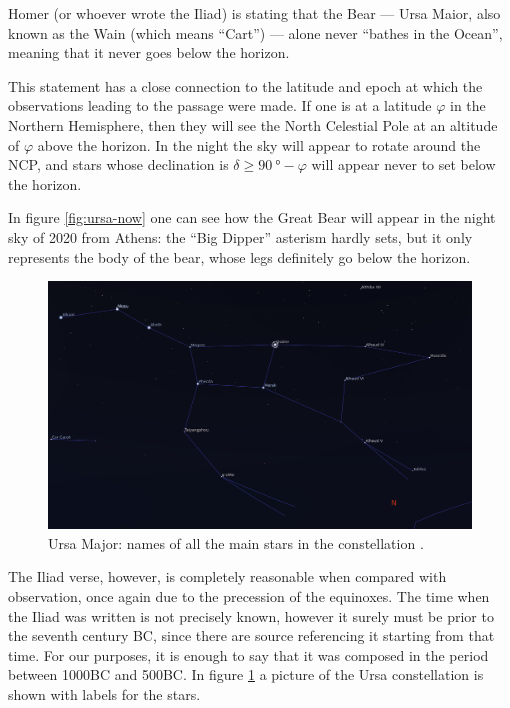 \documentclass[main.tex]{subfiles}
\begin{document}
Homer (or whoever wrote the Iliad) is stating that the Bear --- Ursa Maior, also known as the Wain (which means ``Cart'') --- alone never ``bathes in the Ocean'', meaning that it never goes below the horizon. 

This statement has a close connection to the latitude and epoch at which the observations leading to the passage were made. 
If one is at a latitude \(\varphi \) in the Northern Hemisphere, then they will see the North Celestial Pole at an altitude of \(\varphi \) above the horizon. In the night the sky will appear to rotate around the NCP, and stars whose declination is \(\delta \geq \SI{90}{\degree} - \varphi \) will appear never to set below the horizon. 

In figure \ref{fig:ursa-now} one can see how the Great Bear will appear in the night sky of 2020 from Athens: the ``Big Dipper'' asterism hardly sets, but it only represents the body of the bear, whose legs definitely go below the horizon. 

\begin{figure}[ht]
\centering
\includegraphics[width=\textwidth]{figures/ursa_names.png}
\caption{Ursa Major: names of all the main stars in the constellation \cite[]{stellariumcontributorsStellariumAstronomySoftware2020}.}
\label{fig:ursa-names}
\end{figure}

The Iliad verse, however, is completely reasonable when compared with observation, once again due to the precession of the equinoxes. 
The time when the Iliad was written is not precisely known, however it surely must be prior to the seventh century BC, since there are source referencing it starting from that time.
For our purposes, it is enough to say that it was composed in the period between 1000BC and 500BC.
In figure \ref{fig:ursa-names} a picture of the Ursa constellation is shown with labels for the stars.
\end{document}
